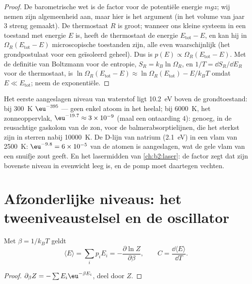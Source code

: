 \begin{proof}
De barometrische wet is de factor voor de potentiële energie $mgz$; wij
nemen zijn algemeenheid aan, maar hier is het argument (in het volume van
jaar 3 streng gemaakt). De thermostaat $R$ is groot; wanneer ons kleine systeem in
een toestand met energie $E$ is, heeft de thermostaat de energie
$E_{\text{tot}} -
E$, en kan hij in $\Omega_R(E_{\text{tot}} - E)$
microscopische toestanden zijn, alle
even waarschijnlijk (het grondpostulaat voor een geïsoleerd geheel). Dus is
$p(E) \propto \Omega_R(E_{\text{tot}} - E)$. Met de definitie van Boltzmann
voor de entropie, $S_R = k_B\ln\Omega_R$, en $1/T = \dd S_R/\dd E_R$ voor de
thermostaat, is
$\ln\Omega_R(E_{\text{tot}} - E) \approx \ln\Omega_R(E_{\text{tot}})
- E/k_BT$
omdat $E \ll E_{\text{tot}}$; neem de exponentiële.
\end{proof}

\begin{example}\label{ex:b2:boltzmann-factor:levels}
Het eerste aangeslagen niveau van waterstof ligt \qty{10.2}{eV} boven de
grondtoestand: bij \qty{300}{K} $\eu^{-395}$ --- geen enkel atoom in het heelal; bij
\qty{6000}{K}, het zonneoppervlak, $\eu^{-19.7} \approx 3 \times 10^{-9}$ (maal
een ontaarding $4$): genoeg, in de reusachtige gaskolom van de zon, voor de
balmerabsorptielijnen, die het sterkst zijn in sterren nabij \qty{10000}{K}.
De D-lijn van natrium (\qty{2.1}{eV}) in een vlam van \qty{2500}{K}:
$\eu^{-9.8} = 6
\times 10^{-5}$ van de atomen is aangeslagen, wat de gele
vlam van een
snuifje zout geeft. En het lasermidden van \cref{ch:b2:laser}: de factor
zegt dat zijn bovenste niveau in evenwicht leeg is, en de pomp moet daartegen
vechten.
\end{example}

\section{Afzonderlijke niveaus: het tweeniveaustelsel en de oscillator}

\begin{proposition}\label{prop:b2:boltzmann-factor:meanE}
Met $\beta = 1/k_BT$ geldt
\[
\langle E\rangle = \sum_ip_iE_i = -\frac{\partial\ln Z}{\partial\beta}, \qquad
C = \frac{\dd\langle E\rangle}{\dd T} .
\]
\end{proposition}

\begin{proof}
$\partial_\beta Z = -\sum E_i\eu^{-\beta E_i}$, deel door $Z$.
\end{proof}

